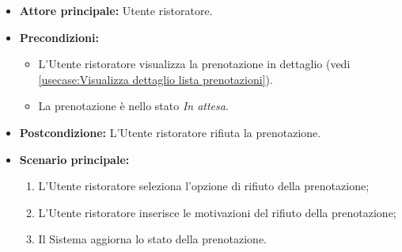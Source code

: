 \label{usecase:Rifiuta prenotazione}
\begin{itemize}
	\item \textbf{Attore principale:} Utente ristoratore.

	\item \textbf{Precondizioni:}
	      \begin{itemize}
		      \item L'Utente ristoratore visualizza la prenotazione in dettaglio (vedi \autoref{usecase:Visualizza dettaglio lista prenotazioni}).
		      \item La prenotazione è nello stato \textit{In attesa}.
	      \end{itemize}

	\item \textbf{Postcondizione:} L'Utente ristoratore rifiuta la prenotazione.



	\item \textbf{Scenario principale:}
	      \begin{enumerate}
		      \item L'Utente ristoratore seleziona l'opzione di rifiuto della prenotazione;

		      \item L'Utente ristoratore inserisce le motivazioni del rifiuto della prenotazione;

		      \item Il Sistema aggiorna lo stato della prenotazione.

	      \end{enumerate}
\end{itemize}
